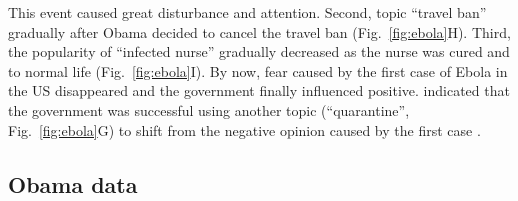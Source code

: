 This event caused great disturbance and  attention.
Second, topic ``travel ban'' gradually  after  Obama decided to cancel the travel ban (Fig.~\ref{fig:ebola}H).
Third, the popularity of ``infected nurse'' gradually decreased as the nurse was cured and  to normal life (Fig.~\ref{fig:ebola}I).
By now, fear caused by the first case of Ebola in the US disappeared and the government finally influenced   positive.
 indicated that the government was successful  using another topic (``quarantine'', Fig.~\ref{fig:ebola}G) to shift   from the negative opinion caused by the first  case .

\subsection{Obama data}


